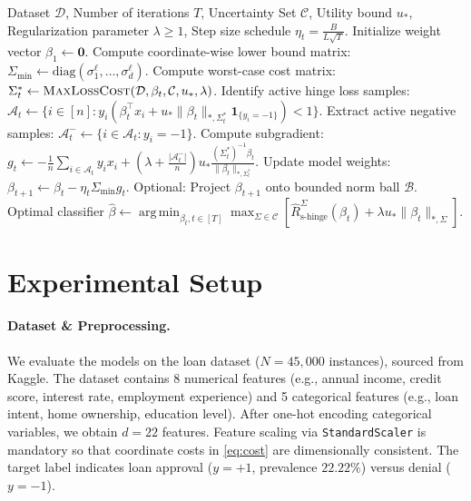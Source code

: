 \documentclass[10pt, letterpaper]{article}
\newcommand{\C}{\mathcal{C}}
\newcommand{\B}{\mathcal{B}}
\newcommand{\D}{\mathcal{D}}
\newcommand{\diag}{\text{diag}}
\newcommand{\argmin}{\mathop{\mathrm{arg\,min}}}
\newcommand{\Rshingehat}{\hat{R}_{\text{s-hinge}}}
\begin{document}
\begin{algorithm}[H]
\caption{Full-Batch Subgradient Descent on Regularized Strategic Risk \cite{rosenfeld2024oneshot}}
\label{alg:subgradient}
\begin{algorithmic}[1]
\Require Dataset $\D$, Number of iterations $T$, Uncertainty Set $\C$, Utility bound $u_*$, Regularization parameter $\lambda \ge 1$, Step size schedule $\eta_t = \frac{B}{L\sqrt{T}}$.
\State Initialize weight vector $\beta_1 \leftarrow \mathbf{0}$.
\State Compute coordinate-wise lower bound matrix: $\Sigma_{\min} \leftarrow \diag(\sigma_1^\ell, \dots, \sigma_d^\ell)$.
    \State Compute worst-case cost matrix: $\Sigma_t^* \leftarrow \textsc{MaxLossCost}(\D, \beta_t, \C, u_*, \lambda)$.
    \State Identify active hinge loss samples: $\mathcal{A}_t \leftarrow \{ i \in [n] : y_i (\beta_t^\top x_i + u_* \|\beta_t\|_{*,\Sigma_t^*} \mathbf{1}_{\{y_i = -1\}}) < 1 \}$.
    \State Extract active negative samples: $\mathcal{A}_t^- \leftarrow \{ i \in \mathcal{A}_t : y_i = -1 \}$.
    \State Compute subgradient:
    \State \quad $g_t \leftarrow -\frac{1}{n} \sum_{i \in \mathcal{A}_t} y_i x_i + \left( \lambda + \frac{|\mathcal{A}_t^-|}{n} \right) u_* \frac{(\Sigma_t^*)^{-1} \beta_t}{\|\beta_t\|_{*,\Sigma_t^*}}$.
    \State Update model weights: $\beta_{t+1} \leftarrow \beta_t - \eta_t \Sigma_{\min} g_t$.
    \State Optional: Project $\beta_{t+1}$ onto bounded norm ball $\B$.
\EndFor
\State \Return Optimal classifier $\hat{\beta} \leftarrow \argmin_{\beta_t, t \in [T]} \max_{\Sigma \in \C} \left[ \Rshingehat^\Sigma(\beta_t) + \lambda u_* \|\beta_t\|_{*,\Sigma} \right]$.
\end{algorithmic}
\end{algorithm}

\section{Experimental Setup}
\label{sec:setup}

\paragraph{Dataset \& Preprocessing.} We evaluate the models on the  loan dataset ($N = 45{,}000$ instances), sourced from Kaggle. The dataset contains 8 numerical features (e.g., annual income, credit score, interest rate, employment experience) and 5 categorical features (e.g., loan intent, home ownership, education level). After one-hot encoding categorical variables, we obtain $d = 22$ features. Feature scaling via \texttt{StandardScaler} is mandatory so that coordinate costs in \eqref{eq:cost} are dimensionally consistent. The target label indicates loan approval ($y = +1$, prevalence $22.22\%$) versus denial ($y = -1$).
\end{document}
